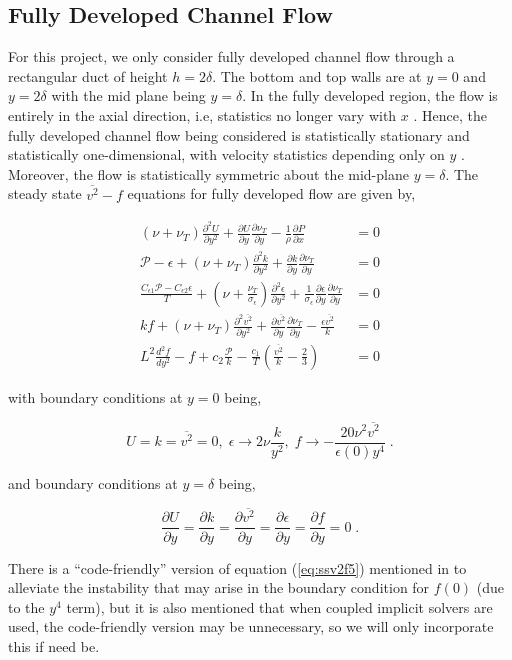 \documentclass[12pt]{article}
\newcommand{\ep}{\epsilon} \newcommand{\noi}{\noindent}
\newcommand{\pr}{\partial}
\begin{document}
\subsection{Fully Developed Channel Flow}

For this project, we only consider fully developed channel flow through a rectangular duct of
height $h=2 \delta$. The bottom and top walls are at $y = 0$ and $y =
2 \delta$ with the mid plane being $y = \delta$. In the fully developed region,
the flow is entirely in the axial direction, i.e,  statistics no longer vary with
$x$ \cite{pope}. Hence, the
fully developed channel flow being considered is statistically stationary and
statistically one-dimensional, with velocity statistics depending only on $y$
\cite{pope}. Moreover, the flow is statistically symmetric about the mid-plane $y = \delta$.
The steady state $\overline{v^2}-f$ equations for fully developed flow are given
by, 

\begin{align}
	\label{eq:ssv2f1}
	(\nu + \nu_T) \frac{\pr^2 U}{\pr y^2} + \frac{\pr U}{\pr y}
	\frac{\pr \nu_T}{\pr y} - \frac{1}{\rho} \frac{\pr P }{\pr x} &= 0 \\
	\mathcal{P} - \ep + (\nu+ \nu_T) \frac{\pr^2 k }{\pr y^2} +
	\frac{\pr k}{\pr y} \frac{\pr \nu_T}{\pr y} &=0\\
	\frac{C_{\ep 1 } \mathcal{P} - C_{\ep 2 } \ep}{T} + \left(\nu +
	\frac{\nu_T}{ \sigma_\ep}
	\right) \frac{\pr^2 \ep}{\pr y^2 } + \frac{1}{\sigma_\ep}
	\frac{\pr \ep}{\pr y} \frac{\pr \nu_T}{\pr y} &= 0 \\
	kf + (\nu + \nu_T) \frac{\pr^2 \overline{v^2}}{\pr y^2} +
	\frac{\pr \overline{v^2}}{\pr y} \frac{\pr \nu_T}{\pr y} -
	\frac{\ep \overline{v^2}}{k} &= 0 \\
	L^2 \frac{d^2 f }{dy^2} - f + c_2 \frac{\mathcal{P}}{k} -
	\frac{c_1}{T} \left( \frac{\overline{v^2}}{k} - \frac{2}{3}\right) &=0
	\label{eq:ssv2f5}
\end{align}

\noi with boundary conditions at $y = 0$ being, 

\[ U =  k =  \overline{v^2}= 0, \; \ep \to 2 \nu \frac{k}{y^2}, \; f \to -
\frac{20 \nu^2 \overline{v^2}}{\ep(0)y^4}\; .\] 

\noi and boundary conditions at $y = \delta$ being, 

\[ \frac{\pr U}{\pr y} = \frac{\pr k}{\pr y} = \frac{\pr
	\overline{v^2}}{\pr y} = \frac{\pr \ep}{\pr y} = \frac{\pr f}{\pr y} = 0
\; . \]

There is a ``code-friendly'' version of equation (\ref{eq:ssv2f5}) mentioned in
\cite{lien1996non} to alleviate the instability that may arise in the boundary
condition for $f(0)$ (due to the  $y^4$ term), but it is also mentioned that
when coupled implicit solvers are used, the code-friendly version may be
unnecessary, so we will only incorporate this if need be. 
\end{document}
